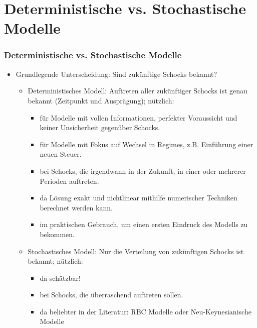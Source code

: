 \documentclass[10pt]{beamer}  %
\begin{document}
\section{Deterministische vs. Stochastische Modelle}
\begin{frame}\frametitle{Deterministische vs. Stochastische Modelle}
	\begin{itemize}
		\item Grundlegende Unterscheidung: Sind zuk\"{u}nftige Schocks bekannt?
		\begin{itemize}
			\item Deterministisches Modell: Auftreten aller zuk\"{u}nftiger Schocks ist genau bekannt (Zeitpunkt und Auspr\"{a}gung); n\"{u}tzlich:
            \begin{itemize}
			\item f\"{u}r Modelle mit vollen Informationen, perfekter Voraussicht und keiner Unsicherheit gegen\"{u}ber Schocks.
			\item f\"{u}r Modelle mit Fokus auf Wechsel in Regimes, z.B. Einf\"{u}hrung einer neuen Steuer.
			\item bei Schocks, die irgendwann in der Zukunft, in einer oder mehrerer Perioden auftreten.
			\item da L\"{o}sung exakt und nichtlinear mithilfe numerischer Techniken berechnet werden kann.
			\item im praktischen Gebrauch, um einen ersten Eindruck des Modells zu bekommen.		
            \end{itemize}
			\item Stochastisches Modell: Nur die Verteilung von zuk\"{u}nftigen Schocks ist bekannt; n\"{u}tzlich:
            \begin{itemize}
            \item da sch\"{a}tzbar!
            \item bei Schocks, die \"{u}berraschend auftreten sollen.
            \item da beliebter in der Literatur: RBC Modelle oder Neu-Keynesianische Modelle
            \end{itemize}
		\end{itemize}
	\end{itemize}
\end{frame}
\end{document}
